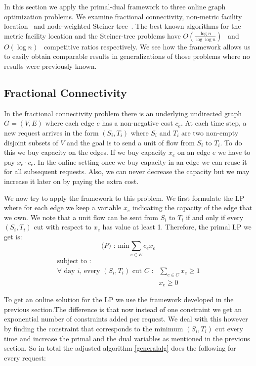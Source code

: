 In this section we apply the primal-dual framework to three online graph optimization problems. We examine fractional connectivity, non-metric facility location~\cite{Alon06:opt} and node-weighted Steiner tree~\cite{naor11:node-weighted-steiner-tree}. The best known algorithms for the metric facility location and the Steiner-tree problems have $O(\frac{ \log n }{ \log \log n} )$~\cite{fotakis03:facility} and $O({ \log n} )$~\cite{imase91:dynamic-steiner} competitive ratios respectively. We see how the framework allows us to easily obtain comparable results in generalizations of those problems where no results were previously known.

\subsection{Fractional Connectivity}

In the fractional connectivity problem there is an underlying undirected graph $G = (V,E)$ where each edge $e$ has a non-negative cost $c_e$. At each time step, a new request arrives in the form $(S_i,T_i)$ where $S_i$ and $T_i$ are two non-empty disjoint subsets of $V$ and the goal is to send a unit of flow from $S_i$ to $T_i$. To do this we buy capacity on the edges. If we buy capacity $x_e$ on an edge $e$ we have to pay $x_e \cdot c_e$. In the online setting once we buy capacity in an edge we can reuse it for all subsequent requests. Also, we can never decrease the capacity but we may increase it later on by paying the extra cost.

We now try to apply the framework to this problem. We first formulate the LP where for each edge we keep a variable $x_e$ indicating the capacity of the edge that we own. We note that a unit flow can be sent from $S_i$ to $T_i$ if and only if every $(S_i, T_i)$ cut with respect to $x_e$ has value at least 1. Therefore, the primal LP we get is: 
\[
\textrm{($P$) : min}  \sum_{e \in E} c_e x_e
\]
\[
	\begin{array}{rr}
	\textrm{subject to :} & \\
		\textrm{$\forall$ day $i$, every $(S_i,T_i)$ cut $C$} \textrm{ :} & \sum_{e \in C} x_e  \ge 1  \\
			    & x_e \geq 0
	\end{array}
\]

To get an online solution for the LP we use the framework developed in the previous section.The difference is that now instead of one constraint we get an exponential number of constraints added per request. We deal with this however by finding the constraint that corresponds to the minimum $(S_i,T_i)$ cut every time and increase the primal and the dual variables as mentioned in the previous section. So in total the adjusted algorithm \ref{generalalg} does the following for every request:

